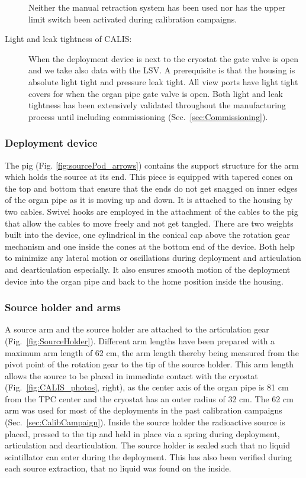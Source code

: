 \begin{description}
Neither the manual retraction system has been used nor has the upper limit switch been activated during calibration campaigns.


     
\item[Light and leak tightness of CALIS:]
When the deployment device is next to the cryostat the gate valve is open and we take also data with the LSV. A prerequisite is that the housing is absolute light tight and pressure leak tight. All view ports have light tight covers for when the organ pipe gate valve is open. Both light and leak tightness has been extensively validated throughout the manufacturing process until including commissioning (Sec.~\ref{sec:Commissioning}).

\end{description}
	

\subsubsection{Deployment device}
The pig (Fig. \ref{fig:sourcePod_arrows}) contains the support structure for the arm which holds the source at its end.  This piece is equipped with tapered cones on the top and bottom that ensure that the ends do not get snagged on inner edges of the organ pipe as it is moving up and down. It is attached to the housing by two cables.  Swivel hooks are employed in the attachment of the cables to the pig that allow the cables to move freely and not get tangled. 
There are two weights built into the device, one cylindrical in the conical cap above the rotation gear mechanism and one inside the cones at the bottom end of the device. Both help to minimize any lateral motion or oscillations during deployment and articulation and dearticulation especially. It also ensures smooth motion of the deployment device into the organ pipe and back to the home position inside the housing.

\subsubsection{Source holder and arms}
A source arm and the source holder are attached to the articulation gear (Fig.~\ref{fig:SourceHolder}). Different arm lengths have been prepared with a maximum arm length of 62 cm, the arm length thereby being measured from the pivot point of the rotation gear to the tip of the source holder. This arm length allows the source to be placed in immediate contact with the cryostat (Fig.~\ref{fig:CALIS_photos}, right), as the center axis of the organ pipe is 81 cm from the TPC center and the cryostat has an outer radius of 32 cm. The 62 cm arm was used for most of the deployments in the past calibration campaigns (Sec.~\ref{sec:CalibCampaign}). Inside the source holder the radioactive source is placed, pressed to the tip and held in place via a spring during deployment, articulation and dearticulation. The source holder is sealed such that no liquid scintillator can enter during the deployment. This has also been verified during each source extraction, that no liquid was found on the inside.

